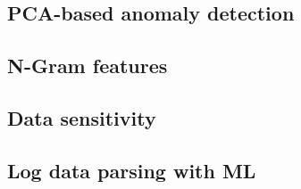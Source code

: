 

\subsection{PCA-based anomaly detection}\label{subsec:bg-pca-ada}



\subsection{N-Gram features}\label{subsec:bg-ngram-features}


\subsection{Data sensitivity}\label{subsec:bg-data-sensitivity}


\subsection{Log data parsing with ML}\label{subsec:bg-log-data-parsing-with-ml}











\clearpage